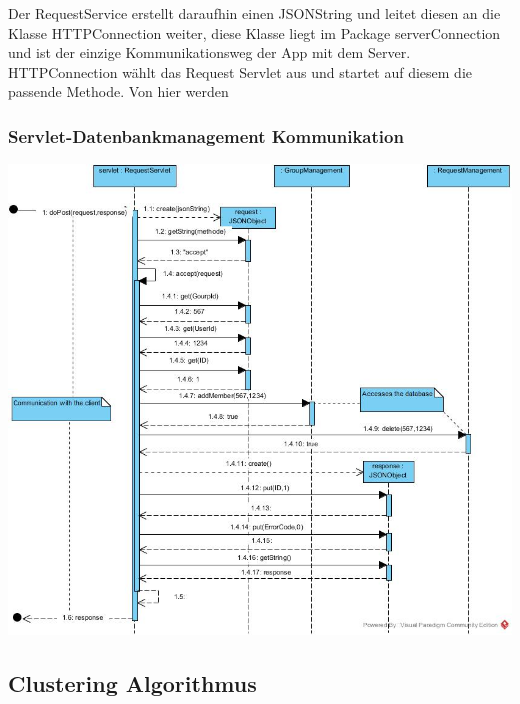 Der RequestService erstellt daraufhin einen JSONString und leitet diesen an die Klasse HTTPConnection weiter, diese Klasse liegt im  Package serverConnection und ist der einzige Kommunikationsweg der App mit dem Server.
HTTPConnection wählt das Request Servlet aus und startet auf diesem die passende Methode.
Von hier werden 

\subsubsection{Servlet-Datenbankmanagement Kommunikation}

\includegraphics[width=1.1\textwidth]{Servlet_MAnagement.jpg}


\subsection{Clustering Algorithmus}
	
	\newpage